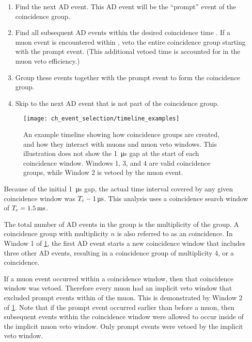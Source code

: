 \begin{enumerate}
    \item Find the next AD event.
        This AD event will be the ``prompt'' event of the coincidence group.
    \item Find all subsequent AD events within the desired coincidence time \tc.
        If a muon event is encountered within \tc,
        veto the entire coincidence group starting with the prompt event.
        (This additional vetoed time is accounted for in the muon veto efficiency.)
    \item Group these events together with the prompt event
        to form the coincidence group.
    \item Skip to the next AD event that is not part of the coincidence group.
\end{enumerate}

\begin{figure}
    \centering
    \texttt{[image: ch\_event\_selection/timeline\_examples]}
    \caption[Coincidence groups diagram]{
        An example timeline showing how coincidence groups are created,
        and how they interact with muons and muon veto windows.
        This illustration does not show the \SI{1}{\micro\second} gap
        at the start of each coincidence window.
        Windows 1, 3, and 4 are valid coincidence groups,
        while Window 2 is vetoed by the muon event.
    }
    \label{fig:timeline_examples}
\end{figure}

Because of the initial \SI{1}{\micro\second} gap,
the actual time interval covered by any given coincidence window was
$T_c - \SI{1}{\micro\second}$.
This analysis uses a coincidence search window of $T_c = \SI{1.5}{\milli\second}$.

The total number of AD events in the group
is the multiplicity of the group.
A coincidence group with multiplicity $n$ is also referred to
as an  coincidence.
In Window 1 of \cref{fig:timeline_examples},
the first AD event starts a new coincidence window
that includes three other AD events,
resulting in a coincidence group of multiplicity 4, or a  coincidence.

If a muon event occurred within a coincidence window,
then that coincidence window was vetoed.
Therefore every muon had an implicit veto window
that excluded prompt events within \tc{} of the muon.
This is demonstrated by Window 2 of \cref{fig:timeline_examples}.
Note that if the prompt event occurred earlier than \tc{} before a muon,
then subsequent events within the coincidence window
were allowed to occur inside of the implicit muon veto window.
Only prompt events were vetoed by the implicit veto window.

